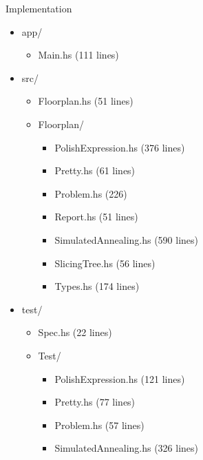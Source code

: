\documentclass[xcolor=pdftex,dvipsnames,table]{beamer}
\begin{document}
\begin{frame}{Implementation}
  \begin{itemize}
      \item app/
        \begin{itemize}
          \item Main.hs (111 lines)
        \end{itemize}
      \item src/
        \begin{itemize}
          \item Floorplan.hs (51 lines)
            \item Floorplan/
              \begin{itemize}
                \item PolishExpression.hs (376 lines)
                \item Pretty.hs (61 lines)
                \item Problem.hs (226)
                \item Report.hs (51 lines)
                \item SimulatedAnnealing.hs (590 lines)
                \item SlicingTree.hs (56 lines)
                \item Types.hs (174 lines)
              \end{itemize}
        \end{itemize}
      \item test/
        \begin{itemize}
          \item Spec.hs (22 lines)
            \item Test/
              \begin{itemize}
                \item PolishExpression.hs (121 lines)
                \item Pretty.hs (77 lines)
                \item Problem.hs (57 lines)
                \item SimulatedAnnealing.hs (326 lines)
              \end{itemize}
        \end{itemize}
  \end{itemize}
\end{frame}

\end{document}
